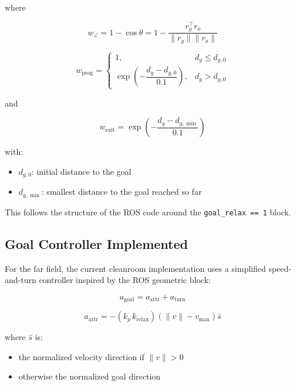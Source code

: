 \documentclass[11pt]{article}
\begin{document}
where

\begin{equation}
w_{\angle}
=
1 - \cos \theta
=
1 - \frac{r_g^\top r_o}{\lVert r_g \rVert \lVert r_o \rVert}
\end{equation}

\begin{equation}
w_{\text{prog}}
=
\begin{cases}
1, & d_g \le d_{g,0} \\
\exp\left(-\dfrac{d_g - d_{g,0}}{0.1}\right), & d_g > d_{g,0}
\end{cases}
\end{equation}

and

\begin{equation}
w_{\text{exit}}
=
\exp\left(-\dfrac{d_g - d_{g,\min}}{0.1}\right)
\end{equation}

with:

\begin{itemize}[leftmargin=*]
  \item $d_{g,0}$: initial distance to the goal
  \item $d_{g,\min}$: smallest distance to the goal reached so far
\end{itemize}

This follows the structure of the ROS code around the \texttt{goal\_relax == 1} block.

\subsection*{Goal Controller Implemented}

For the far field, the current cleanroom implementation uses a simplified
speed-and-turn controller inspired by the ROS geometric block:

\begin{equation}
a_{\text{goal}} = a_{\text{attr}} + a_{\text{turn}}
\end{equation}

\begin{equation}
a_{\text{attr}}
=
-\left(k_p\,k_{\text{relax}}\right)
\left(\lVert v \rVert - v_{\max}\right)\hat{s}
\end{equation}

where $\hat{s}$ is:

\begin{itemize}[leftmargin=*]
  \item the normalized velocity direction if $\lVert v \rVert > 0$
  \item otherwise the normalized goal direction
\end{itemize}
\end{document}
